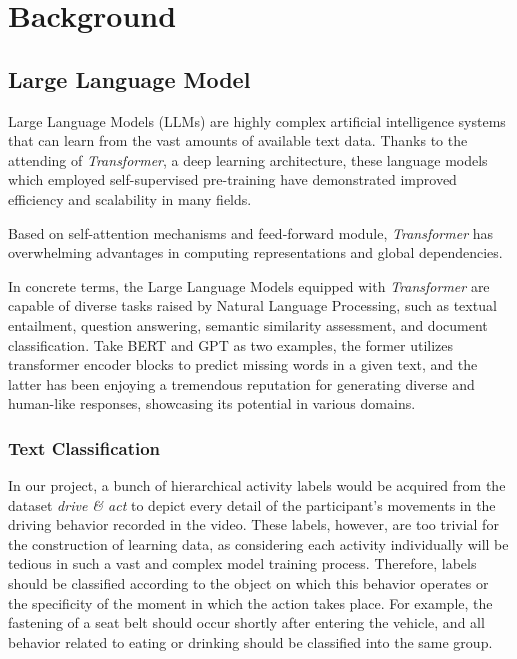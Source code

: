 

\chapter{Background}\label{chapter:background}


\section{Large Language Model}


Large Language Models (LLMs) are highly complex artificial intelligence systems that can learn from the vast amounts of available text data\cite{radford2018improving}. Thanks to the attending of \textit{Transformer}\cite{vaswani2017attention}, a deep learning architecture, these language models which employed self-supervised pre-training have demonstrated improved efficiency and scalability in many fields.

Based on self-attention mechanisms and feed-forward module, \textit{Transformer} has overwhelming advantages in computing representations and global dependencies.

In concrete terms, the Large Language Models equipped with \textit{Transformer} are capable of diverse tasks raised by Natural Language Processing\cite{chowdhary2020natural}, such as textual entailment, question answering, semantic similarity assessment, and document classification. Take BERT\cite{alaparthi2020bidirectional} and GPT\cite{radford2018improving,radford2019language,brown2020language} as two examples, the former utilizes transformer encoder blocks to predict missing words in a given text, and the latter has been enjoying a tremendous reputation for generating diverse and human-like responses, showcasing its potential in various domains.

    \subsection{Text Classification}
In our project, a bunch of hierarchical activity labels would be acquired from the dataset \textit{drive \& act} to depict every detail of the participant's movements in the driving behavior recorded in the video. These labels, however, are too trivial for the construction of learning data, as considering each activity individually will be tedious in such a vast and complex model training process. Therefore, labels should be classified according to the object on which this behavior operates or the specificity of the moment in which the action takes place. For example, the fastening of a seat belt should occur shortly after entering the vehicle, and all behavior related to eating or drinking should be classified into the same group.

